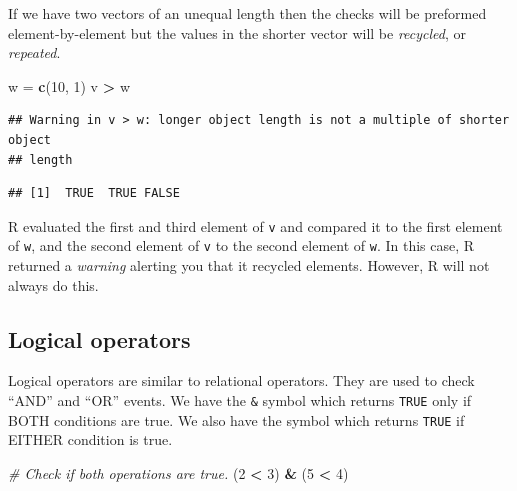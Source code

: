 \documentclass[
]{book}
\newenvironment{Shaded}{\begin{snugshade}}{\end{snugshade}}
\newcommand{\CommentTok}[1]{\textcolor[rgb]{0.56,0.35,0.01}{\textit{#1}}}
\newcommand{\DecValTok}[1]{\textcolor[rgb]{0.00,0.00,0.81}{#1}}
\newcommand{\KeywordTok}[1]{\textcolor[rgb]{0.13,0.29,0.53}{\textbf{#1}}}
\newcommand{\NormalTok}[1]{#1}
\newcommand{\OperatorTok}[1]{\textcolor[rgb]{0.81,0.36,0.00}{\textbf{#1}}}
\newcommand{\StringTok}[1]{\textcolor[rgb]{0.31,0.60,0.02}{#1}}
\begin{document}
If we have two vectors of an unequal length then the checks will be preformed element-by-element but the values in the shorter vector will be \emph{recycled}, or \emph{repeated}.

\begin{Shaded}
\begin{Highlighting}[]
\NormalTok{w =}\StringTok{ }\KeywordTok{c}\NormalTok{(}\DecValTok{10}\NormalTok{, }\DecValTok{1}\NormalTok{)}
\NormalTok{v }\OperatorTok{>}\StringTok{ }\NormalTok{w}
\end{Highlighting}
\end{Shaded}

\begin{verbatim}
## Warning in v > w: longer object length is not a multiple of shorter object
## length
\end{verbatim}

\begin{verbatim}
## [1]  TRUE  TRUE FALSE
\end{verbatim}

R evaluated the first and third element of \texttt{v} and compared it to the first element of \texttt{w}, and the second element of \texttt{v} to the second element of \texttt{w}. In this case, R returned a \emph{warning} alerting you that it recycled elements. However, R will not always do this.

\hypertarget{logical-operators}{%
\subsection*{Logical operators}\label{logical-operators}}

Logical operators are similar to relational operators. They are used to check ``AND'' and ``OR'' events. We have the \texttt{\&} symbol which returns \texttt{TRUE} only if BOTH conditions are true. We also have the \texttt{\textbar{}} symbol which returns \texttt{TRUE} if EITHER condition is true.

\begin{Shaded}
\begin{Highlighting}[]
\CommentTok{# Check if both operations are true. }
\NormalTok{(}\DecValTok{2} \OperatorTok{<}\StringTok{ }\DecValTok{3}\NormalTok{) }\OperatorTok{&}\StringTok{ }\NormalTok{(}\DecValTok{5} \OperatorTok{<}\StringTok{ }\DecValTok{4}\NormalTok{)}
\end{Highlighting}
\end{Shaded}
\end{document}
